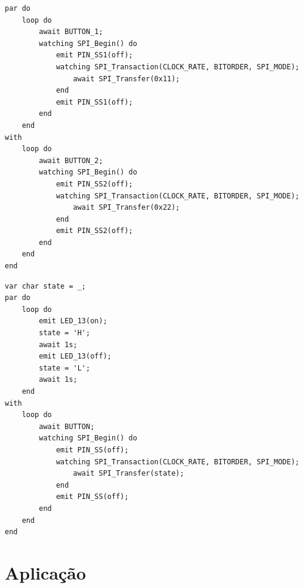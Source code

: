 \documentclass[11pt]{article}
\begin{document}
\begin{lstlisting}[style=CStyle,label=spi-ceu-abstraction,caption=Transações concorrentes utilizando operações encapsuladas]
par do
    loop do
        await BUTTON_1;
        watching SPI_Begin() do
            emit PIN_SS1(off);
            watching SPI_Transaction(CLOCK_RATE, BITORDER, SPI_MODE);
                await SPI_Transfer(0x11);
            end
            emit PIN_SS1(off);
        end
    end
with
    loop do
        await BUTTON_2;
        watching SPI_Begin() do
            emit PIN_SS2(off);
            watching SPI_Transaction(CLOCK_RATE, BITORDER, SPI_MODE);
                await SPI_Transfer(0x22);
            end
            emit PIN_SS2(off);
        end
    end
end
\end{lstlisting}
\begin{lstlisting}[style=CStyle,label=spi-ceu-abstraction-final,caption=Aplicação utilizando driver SPI em Céu com operações encapsuladas]
var char state = _;
par do
    loop do
        emit LED_13(on);
        state = 'H';
        await 1s;
        emit LED_13(off);
        state = 'L';
        await 1s;
    end
with
    loop do
        await BUTTON;
        watching SPI_Begin() do
            emit PIN_SS(off);
            watching SPI_Transaction(CLOCK_RATE, BITORDER, SPI_MODE);
                await SPI_Transfer(state);
            end
            emit PIN_SS(off);
        end
    end
end
\end{lstlisting}
\section{Aplicação}
\end{document}
